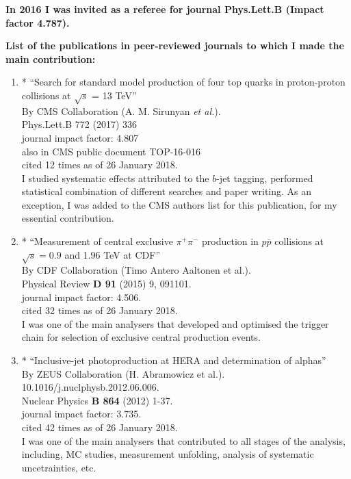 \textbf{In 2016 I was invited as a referee for journal \textbf{Phys.Lett.B} (Impact factor 4.787).}
\begin{flushleft}
\textbf{List of the publications in peer-reviewed journals to which I made the main contribution:}\\
\end{flushleft}
\begin{enumerate}
	\item* ``Search for standard model production of four top quarks in proton-proton collisions at $\sqrt{s}$ = 13 TeV''\\
	By CMS Collaboration (A. M. Sirunyan {\it et al.}).\\
	Phys.Lett.B 772 (2017) 336\\
	journal impact factor: 4.807\\
	also in CMS public document TOP-16-016\\
	cited 12 times as of 26 January 2018.\\
	I studied systematic effects attributed to the $b$-jet tagging, performed statistical combination of different searches and paper writing. As an exception, I was added to the CMS authors list for this publication, for my essential contribution.
	\item* ``Measurement of central exclusive $\pi^+ \pi^-$ production in $p\bar{p}$ collisions at $\sqrt{s} = 0.9$ and 1.96 TeV at CDF''\\
	By CDF Collaboration (Timo Antero Aaltonen et al.).\\
	Physical Review \textbf{D 91} (2015) 9, 091101. \\
	journal impact factor:  4.506. \\
	cited 32 times as of 26 January 2018.\\
	I was one of the main analysers that developed and optimised the trigger chain for selection of exclusive central production events.
	\item* ``Inclusive-jet photoproduction at HERA and determination of alphas''\\
	By ZEUS Collaboration (H. Abramowicz et al.).\\
	10.1016/j.nuclphysb.2012.06.006.\\
	Nuclear Physics \textbf{B 864} (2012) 1-37.\\
	journal impact factor:  3.735. \\
	cited 42 times as of 26 January 2018. \\
	I was one of the main analysers that contributed to all stages of the analysis, including, MC studies, measurement unfolding, analysis of systematic uncetrainties, etc.

\end{enumerate}
